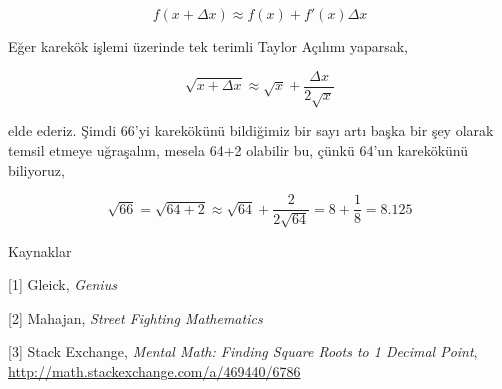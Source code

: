 \documentclass[12pt,fleqn]{article}\usepackage{../../common}
\begin{document}
$$ f(x + \Delta x) \approx f(x) + f'(x)\Delta x $$

Eğer karekök işlemi üzerinde tek terimli Taylor Açılımı yaparsak,

$$ \sqrt{x + \Delta x} \approx \sqrt{x} + \frac{\Delta x}{2\sqrt{x}} $$

elde ederiz. Şimdi 66'yi karekökünü bildiğimiz bir sayı artı başka bir şey
olarak temsil etmeye uğraşalım, mesela 64+2 olabilir bu, çünkü 64'un karekökünü
biliyoruz,

$$
\sqrt{66} = \sqrt{64 + 2} \approx \sqrt{64} + \frac{2}{2\sqrt{64}} =
8 + \frac{1}{8} = 8.125 $$

Kaynaklar

[1] Gleick, {\em Genius}

[2] Mahajan, {\em Street Fighting Mathematics}

[3] Stack Exchange, {\em Mental Math: Finding Square Roots to 1 Decimal
  Point}, \url{http://math.stackexchange.com/a/469440/6786}
\end{document}
